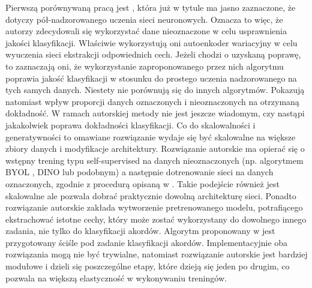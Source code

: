 Pierwszą porównywaną pracą jest \cite{wu_semi-supervised_2020}, która już w tytule ma jasno
zaznaczone, że dotyczy pół-nadzorowanego uczenia sieci neuronowych. Oznacza to więc, że autorzy
zdecydowali się wykorzystać dane nieoznaczone w celu usprawnienia jakości klasyfikacji. Właściwie
wykorzystują oni autoenkoder wariacyjny w celu wyuczenia sieci ekstrakcji odpowiednich cech. Jeżeli
chodzi o uzyskaną poprawę, to zaznaczają oni, że wykorzystanie zaproponowanego przez nich algorytmu
poprawia jakość klasyfikacji w stosunku do prostego uczenia nadzorowanego na tych samych danych.
Niestety nie porównują się do innych algorytmów. Pokazują natomiast wpływ proporcji danych
oznaczonych i nieoznaczonych na otrzymaną dokładność. W ramach autorskiej metody nie jest jeszcze
wiadomym, czy nastąpi jakakolwiek poprawa dokładności klasyfikacji. Co do skalowalności i
generatywności to omawiane rozwiązanie wydaje się być skalowalne na większe zbiory danych i
modyfikacje architektury. Rozwiązanie autorskie ma opierać się o wstępny trening typu
self-supervised na danych nieoznaczonych (np. algorytmem BYOL \cite{grill_bootstrap_2020}, DINO
\cite{caron_emerging_2021} lub podobnym) a następnie dotrenowanie sieci na danych oznaczonych,
zgodnie z procedurą opisaną w \cite{chen_big_2020}. Takie podejście również jest skalowalne ale
pozwala dobrać praktycznie dowolną architekturę sieci. Ponadto rozwiązanie autorskie zakłada
wytworzenie pretrenowanego modelu, potrafiącego ekstrachować istotne cechy, który może zostać
wykorzystany do dowolnego innego zadania, nie tylko do klasyfikacji akordów. Algorytm proponowany w
\cite{wu_semi-supervised_2020} jest przygotowany ściśle pod zadanie klasyfikacji akordów.
Implementacyjnie oba rozwiązania mogą nie być trywialne, natomiast rozwiązanie autorskie jest
bardziej modułowe i dzieli się poszczególne etapy, które dzieją się jeden po drugim, co pozwala na
większą elastyczność w wykonywaniu treningów.

